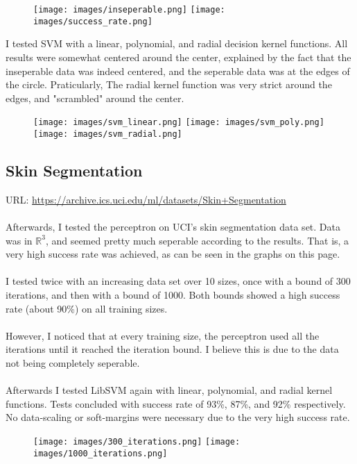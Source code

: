 \documentclass[a4paper]{article}
\begin{document}
\begin{figure}[h!]
    \texttt{[image: images/inseperable.png]}
    \texttt{[image: images/success\_rate.png]}
\end{figure}

\newpage

I tested SVM with a linear, polynomial, and radial decision kernel functions.
All results were somewhat centered around the center, explained by the fact
that the inseperable data was indeed centered, and the seperable data was at
the edges of the circle. Praticularly, The radial kernel function was very strict
around the edges, and "scrambled" around the center.

\begin{figure}[h!]
    \texttt{[image: images/svm\_linear.png]}
    \texttt{[image: images/svm\_poly.png]}
    \texttt{[image: images/svm\_radial.png]}
\end{figure}

\newpage

\subsection {Skin Segmentation}

URL: \url{https://archive.ics.uci.edu/ml/datasets/Skin+Segmentation}
\\\\
Afterwards, I tested the perceptron on UCI's skin segmentation data set.
Data was in $\mathbb{R}^3$, and seemed pretty much seperable according to the
results. That is, a very high success rate was achieved, as can be seen in the
graphs on this page.
\\\\
I tested twice with an increasing data set over 10 sizes,
once with a bound of 300 iterations, and then with a bound of 1000.
Both bounds showed a high success rate (about 90\%) on all training sizes.
\\\\
However, I noticed that at every training size,
the perceptron used all the iterations until it reached the iteration bound.
I believe this is due to the data not being completely seperable.
\\\\
Afterwards I tested LibSVM again with linear, polynomial, and radial kernel functions.
Tests concluded with success rate of 93\%, 87\%, and 92\% respectively.
No data-scaling or soft-margins were necessary due to the very high success rate.

\begin{figure}[h!]
    \texttt{[image: images/300\_iterations.png]}
    \texttt{[image: images/1000\_iterations.png]}
\end{figure}
\end{document}
